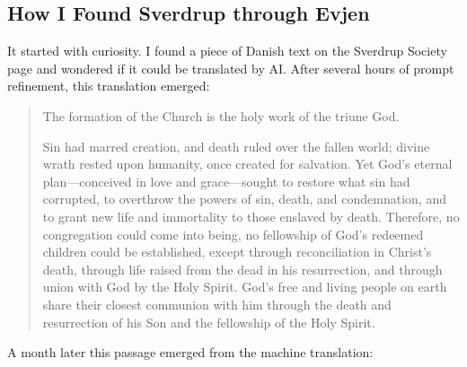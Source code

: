\subsection{How I Found Sverdrup through Evjen}

It started with curiosity. I found a piece of Danish text on the Sverdrup Society page and wondered if it could be translated by AI. After several hours of prompt refinement, this translation emerged:

\begin{quote}

The formation of the Church is the holy work of the triune God.

Sin had marred creation, and death ruled over the fallen world; divine wrath rested upon humanity, once created for salvation. Yet God’s eternal plan—conceived in love and grace—sought to restore what sin had corrupted, to overthrow the powers of sin, death, and condemnation, and to grant new life and immortality to those enslaved by death. Therefore, no congregation could come into being, no fellowship of God’s redeemed children could be established, except through reconciliation in Christ’s death, through life raised from the dead in his resurrection, and through union with God by the Holy Spirit. God’s free and living people on earth share their closest communion with him through the death and resurrection of his Son and the fellowship of the Holy Spirit.

\end{quote}

A month later this passage emerged from the machine translation:

